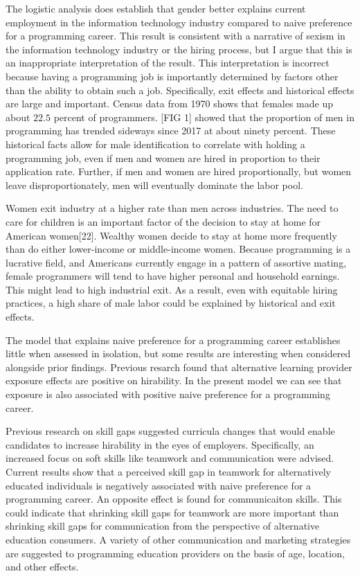 \documentclass[review]{elsarticle}
\begin{document}
The logistic analysis does establish that gender better explains current employment in the information technology industry
compared to naive preference for a programming career.
This result is consistent with a narrative of sexism in the information technology industry or the hiring process,
but I argue that this is an inappropriate interpretation of the result.
This interpretation is incorrect because having a programming job
is importantly determined by factors other than the ability to obtain such a job.
Specifically, exit effects and historical effects are large and important.
Census data from 1970 shows that females made up about $22.5$ percent of programmers\cite{gilchrist1974enumerating}.
[FIG 1] showed that the proportion of men in programming has trended sideways since 2017 at about ninety percent.
These historical facts allow for male identification to correlate with holding a programming job,
even if men and women are hired in proportion to their application rate.
Further, if men and women are hired proportionally, but women leave disproportionately,
men will eventually dominate the labor pool.

Women exit industry at a higher rate than men across industries.
The need to care for children is an important factor of the decision to stay at home
for American women[22].
Wealthy women decide to stay at home more frequently than do either lower-income
or middle-income women.
Because programming is a lucrative field,
and Americans currently engage in a pattern of assortive mating,
female programmers will tend to have higher personal and household earnings.
This might lead to high industrial exit.
As a result, even with equitable hiring practices,
a high share of male labor could be explained by historical and exit effects.

The model that explains naive preference for a programming career
establishes little when assessed in isolation,
but some results are interesting when considered alongside prior findings.
Previous resarch found that alternative learning provider exposure effects are positive on hirability. %
In the present model we can see that exposure is also associated with positive naive preference for a programming career.

Previous research on skill gaps suggested curricula changes that would enable
candidates to increase hirability in the eyes of employers.
Specifically, an increased focus on soft skills like teamwork and communication were advised. %
Current results show that a perceived skill gap in teamwork for alternatively educated individuals
is negatively associated with naive preference for a programming career.
An opposite effect is found for communicaiton skills.
This could indicate that shrinking skill gaps for teamwork are more important
than shrinking skill gaps for communication
from the perspective of alternative education consumers.
A variety of other communication and marketing strategies are suggested
to programming education providers
on the basis of age, location, and other effects.
\end{document}
